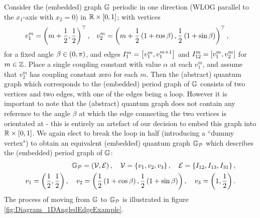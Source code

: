 Consider the (embedded) graph $\mathbb{G}$ periodic in one direction (WLOG parallel to the $x_1$-axis with $x_2=0$) in $\mathbb{R}\times\left[ 0,1 \right]$; with vertices
\begin{align*}
	v_1^m = \left( m + \frac{1}{2}, \frac{1}{2} \right)^\top, 
	&\quad v_2^m = \left( m + \frac{1}{2}\left( 1+\cos\beta \right), \frac{1}{2}\left( 1+\sin\beta \right) \right)^\top,
\end{align*}
for a fixed angle $\beta\in\left( 0,\pi \right)$, and edges $I_{1}^{m} = \left[ v_1^m, v_1^{m+1} \right]$ and $I_{12}^m=\left[ v_1^m, v_2^m \right]$ for $m\in\mathbb{Z}$.
Place a single coupling constant with value $\alpha$ at each $v_1^m$, and assume that $v_2^m$ has coupling constant zero for each $m$.
Then the (abstract) quantum graph which corresponds to the (embedded) period graph of $\mathbb{G}$ consists of two vertices and two edges, with one of the edges being a loop.
However it is important to note that the (abstract) quantum graph does not contain any reference to the angle $\beta$ at which the edge connecting the two vertices is orientated at - this is entirely an artefact of our decision to embed this graph into $\mathbb{R}\times\left[ 0,1 \right]$.
We again elect to break the loop in half (introducing a ``dummy vertex") to obtain an equivalent (embedded) quantum graph $\mathbb{G}_{\mathcal{P}}$ which describes the (embedded) period graph of $\mathbb{G}$:
\begin{align*}
	\mathbb{G}_{\mathcal{P}} = \left( \mathcal{V}, \mathcal{E} \right), \quad
	\mathcal{V} = \left\{  v_1, v_2, v_3  \right\}, \quad
	\mathcal{E} = \left\{  I_{12}, I_{13}, I_{31}  \right\}, \\
	v_1 = \left( \frac{1}{2},\frac{1}{2} \right), \quad
	v_2 = \left( \frac{1}{2}\left( 1+\cos\beta \right), \frac{1}{2}\left( 1+\sin\beta \right) \right), \quad
	v_3 = \left( 1, \frac{1}{2} \right).
\end{align*}
The process of moving from $\mathbb{G}$ to $\mathbb{G}_{\mathcal{P}}$ is illustrated in figure \ref{fig:Diagram_1DAngledEdgeExample}.
